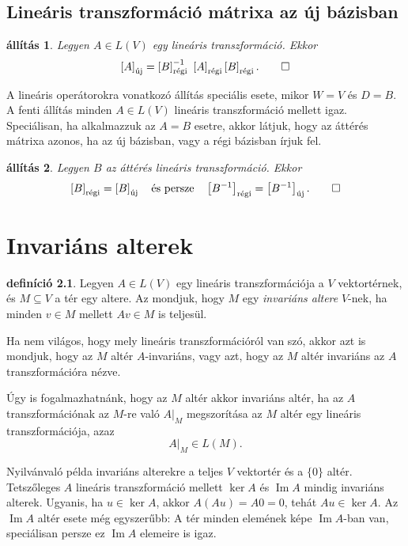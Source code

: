\documentclass[a4paper, showtrims]{memoir}
\makeatletter
\renewenvironment{proof}[1][\proofname]
    {\par\pushQED{\qed}%
    \normalfont \topsep6\p@\@plus6\p@\relax
    \trivlist
    \item[\hskip\labelsep
        \itshape
    #1\@addpunct{:}]\ignorespaces}
    {\popQED\endtrivlist\@endpefalse}
\theoremstyle{plain}
\newtheorem{proposition}{állítás}[chapter]
\theoremstyle{remark}
\theoremstyle{definition}
\newtheorem{definition}[proposition]{definíció}
\DeclareMathOperator{\im}{Im}
\newcommand{\uj}{\text{új}}
\newcommand{\rgi}{\text{régi}}
\makeatother
\begin{document}
\section{Lineáris transzformáció mátrixa az új bázisban}
\begin{proposition}
	Legyen $A\in L\left( V \right)$ egy lineáris transzformáció.
	Ekkor
	\[
		\left[ A \right]_{\uj}
		=
		\left[ B \right]^{-1}_\rgi\
		\left[ A \right]_\rgi
		\left[ B \right]_\rgi.\qedhere
	\]
\end{proposition}
\begin{proof}
	A lineáris operátorokra vonatkozó állítás speciális esete,
	mikor $W=V$ és $D=B$.
\end{proof}
A fenti állítás minden $A\in L\left( V \right)$ lineáris transzformáció mellett igaz.
Speciálisan, ha alkalmazzuk az $A=B$ esetre, akkor látjuk,
hogy az áttérés mátrixa azonos, ha az új bázisban, vagy a régi bázisban írjuk fel.
\begin{proposition}
	Legyen $B$ az áttérés lineáris transzformáció.
	Ekkor
	\[
		\left[ B \right]_\rgi=\left[ B \right]_\uj
		\quad\text{és persze}\quad
		\left[ B^{-1} \right]_\rgi=\left[ B^{-1} \right]_\uj.\qedhere
	\]
\end{proposition}

\chapter{Invariáns alterek}
\begin{definition}
	Legyen $A\in L\left( V \right)$ egy lineáris transzformációja a $V$ vektortérnek,
	és $M\subseteq V$ a tér egy altere.
	Az mondjuk, hogy $M$ egy \emph{invariáns altere}
	$V$-nek, ha minden $v\in M$ mellett $Av\in M$ is teljesül.
\end{definition}
Ha nem világos, hogy mely lineáris transzformációról van szó,
akkor azt is mondjuk, hogy az $M$ altér $A$-invariáns, vagy azt,
hogy az $M$ altér invariáns az $A$ transzformációra nézve.

Úgy is fogalmazhatnánk, hogy az $M$ altér akkor invariáns altér,
ha az $A$ transzformációnak az $M$-re való $A|_M$ megszorítása az $M$
altér egy lineáris transzformációja, azaz
\[
	A|_M\in L\left( M \right).
\]

Nyilvánvaló példa invariáns alterekre a teljes $V$ vektortér és a $\{0\}$ altér.
Tetszőleges $A$ lineáris transzformáció mellett $\ker A$ és $\im A$ mindig invariáns alterek.
Ugyanis, ha $u\in\ker A$, akkor $A\left( Au \right)=A0=0$, tehát $Au\in\ker A$.
Az $\im A$ altér esete még egyszerűbb: A tér minden elemének képe $\im A$-ban van, speciálisan persze ez $\im A$ elemeire is igaz.
\end{document}
